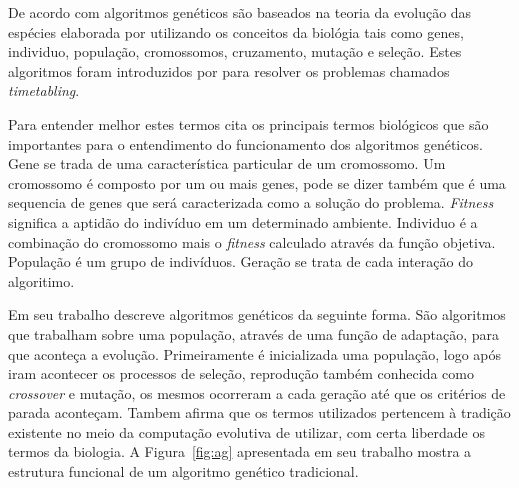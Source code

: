 \documentclass{abntpuc}
\begin{document}
%
%
%


%
%
%



De acordo com \cite{goldberg1989genetic} algoritmos genéticos são baseados na teoria da evolução das espécies elaborada por \cite{darwin1968origin} utilizando os conceitos da biológia tais como genes, individuo, população, cromossomos, cruzamento, mutação e seleção. Estes algoritmos foram introduzidos por \cite{holland1975adaptation} para resolver os problemas chamados \textit{timetabling}.

Para entender melhor estes termos \cite{mitchell1998introduction} cita os principais termos biológicos que são importantes para o entendimento do funcionamento dos algoritmos genéticos. Gene se trada de uma característica particular de um cromossomo. Um cromossomo é composto por um ou mais genes, pode se dizer também que é uma sequencia de genes que será caracterizada como a solução do problema. \textit{Fitness} significa a aptidão do indivíduo em um determinado ambiente. Individuo é a combinação do cromossomo mais o \textit{fitness} calculado através da função objetiva. População é um grupo de indivíduos. Geração se trata de cada interação do algoritimo.\par

Em seu trabalho \cite{lucas2000algoritmos} descreve algoritmos genéticos da seguinte forma. São algoritmos que trabalham sobre uma população, através de uma função de adaptação, para que aconteça a evolução. Primeiramente é inicializada uma população, logo após iram acontecer os processos de seleção, reprodução também conhecida como \textit{crossover} e mutação, os mesmos ocorreram a cada geração até que os critérios de parada aconteçam. Tambem afirma que os termos utilizados pertencem à tradição existente no meio da computação evolutiva de utilizar, com certa liberdade os termos da biologia. A Figura~\ref{fig:ag} apresentada em seu  trabalho mostra a estrutura funcional de um algoritmo genético tradicional. 
\end{document}
